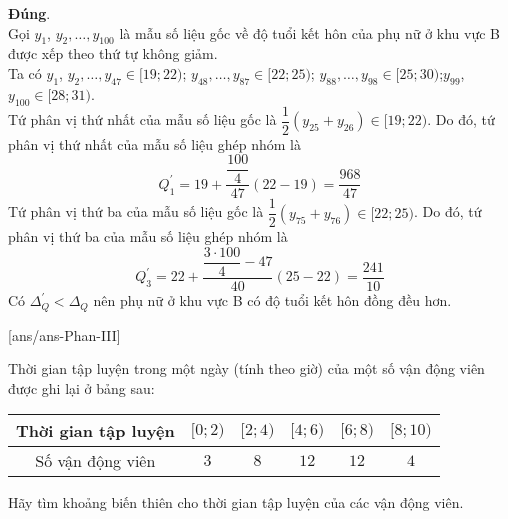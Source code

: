 \begin{ex}
{\begin{itemchoice}
\itemch \textbf{Đúng}.\\
Gọi $y_1$, $y_2,\ldots,y_{100} $ là mẫu số liệu gốc về độ tuổi kết hôn của phụ nữ ở khu vực B được xếp theo thứ tự không giảm.\\
Ta có $y_1$, $y_2,\ldots,y_{47} \in [19;22)$; $ y_{48},\ldots, y_{87} \in[22;25)$; $y_{88}, \ldots, y_{98} \in[25;30)$;$y_{99}$, ${y_{100}}\in[28;31)$.\\
Tứ phân vị thứ nhất của mẫu số liệu gốc là $\dfrac{1}{2}(y_{25}+y_{26})\in[19;22)$.
Do đó, tứ phân vị thứ nhất của mẫu số liệu ghép nhóm là
\[
Q_1^\prime=19+\dfrac{\dfrac{100}{4}}{47}(22-19)=\dfrac{968}{47}
\]
Tứ phân vị thứ ba của mẫu số liệu gốc là $\dfrac{1}{2}(y_{75}+y_{76})\in[22;25)$. Do đó, tứ phân vị thứ ba của mẫu số liệu ghép nhóm là
\[
Q_3^\prime=22+\dfrac{\dfrac{3\cdot 100}{4}-47}{40}(25-22)=\dfrac{241}{10}
\]
Có $\Delta_Q^\prime < \Delta_Q$ nên phụ nữ ở khu vực B có độ tuổi kết hôn đồng đều hơn.
\end{itemchoice}
}
\end{ex}

\TNSA
{}[ans/ans\currfilebase-Phan-III]
\begin{ex}%
Thời gian tập luyện trong một ngày (tính theo giờ) của một số vận động viên được ghi lại ở bảng sau:
\begin{center}
\begin{tabular}{|c|c|c|c|c|c|}
\hline
Thời gian tập luyện &$[0; 2)$ &$[2; 4)$ &$[4; 6)$ &$[6; 8)$ &$[8; 10)$\\
\hline
Số vận động viên & $3$ & $8$ & $12$ & $12$ & $4$\\
\hline
\end{tabular}
\end{center}
Hãy tìm khoảng biến thiên cho thời gian tập luyện của các vận động viên.
\end{ex}


